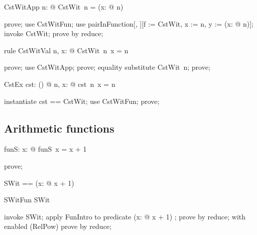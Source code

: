\documentclass{article}
\begin{document}
\begin{theorem}{CstWitApp}
  \forall n: \nat @ CstWit~n = (\lambda x: \nat @ n)
\end{theorem}

\begin{zproof}
prove;
use CstWitFun;
use pairInFunction[\nat, \nat \fun \nat][f := CstWit, x := n, y := (\lambda x: \nat @ n)];
invoke CstWit;
prove by reduce;
\end{zproof}

\begin{theorem}{rule CstWitVal}
  \forall n, x: \nat @ CstWit~n~x = n
\end{theorem}

\begin{zproof}
prove;
use CstWitApp;
prove;
equality substitute CstWit~n;
prove;
\end{zproof}

\begin{theorem}{CstEx}
  \exists cst: \nat \fun (\nat \fun \nat) @ \forall n, x: \nat @ cst~n~x = n
\end{theorem}

\begin{zproof}
instantiate cst == CstWit;
use CstWitFun;
prove;
\end{zproof}

\subsection{Arithmetic functions}

\begin{axdef}
  funS: \nat \fun \nat
\where
   \forall x: \nat @ funS~x = x + 1
\end{axdef}

\begin{zproof}
prove;
\end{zproof}

\begin{zed}
  SWit == (\lambda x: \nat @ x + 1)
\end{zed}

\begin{theorem}{SWitFun}
  SWit \in \nat \fun \nat
\end{theorem}

\begin{zproof}
invoke SWit;
apply FunIntro to predicate (\lambda x: \nat @ x + 1) \in \nat \fun \nat;
prove by reduce;
with enabled (RelPow) prove by reduce;
\end{zproof}
\end{document}
